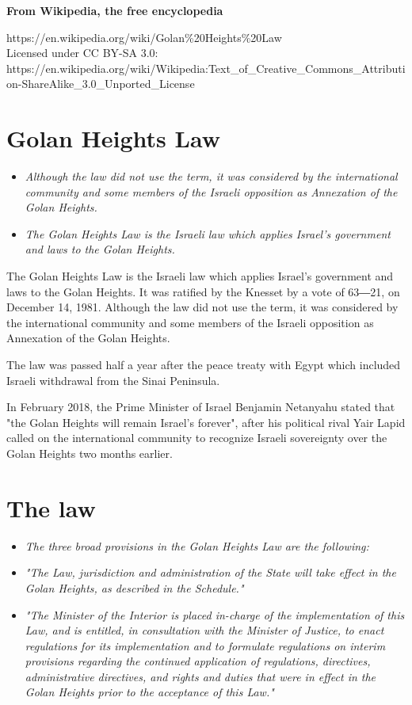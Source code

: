 \textbf{From Wikipedia, the free encyclopedia}

https://en.wikipedia.org/wiki/Golan\%20Heights\%20Law\\
Licensed under CC BY-SA 3.0:\\
https://en.wikipedia.org/wiki/Wikipedia:Text\_of\_Creative\_Commons\_Attribution-ShareAlike\_3.0\_Unported\_License

\section{Golan Heights Law}\label{golan-heights-law}

\begin{itemize}
\item
  \emph{Although the law did not use the term, it was considered by the
  international community and some members of the Israeli opposition as
  Annexation of the Golan Heights.}
\item
  \emph{The Golan Heights Law is the Israeli law which applies Israel's
  government and laws to the Golan Heights.}
\end{itemize}

The Golan Heights Law is the Israeli law which applies Israel's
government and laws to the Golan Heights. It was ratified by the Knesset
by a vote of 63―21, on December 14, 1981. Although the law did not use
the term, it was considered by the international community and some
members of the Israeli opposition as Annexation of the Golan Heights.

The law was passed half a year after the peace treaty with Egypt which
included Israeli withdrawal from the Sinai Peninsula.

In February 2018, the Prime Minister of Israel Benjamin Netanyahu stated
that "the Golan Heights will remain Israel's forever", after his
political rival Yair Lapid called on the international community to
recognize Israeli sovereignty over the Golan Heights two months earlier.

\section{The law}\label{the-law}

\begin{itemize}
\item
  \emph{The three broad provisions in the Golan Heights Law are the
  following:}
\item
  \emph{"The Law, jurisdiction and administration of the State will take
  effect in the Golan Heights, as described in the Schedule."}
\item
  \emph{"The Minister of the Interior is placed in-charge of the
  implementation of this Law, and is entitled, in consultation with the
  Minister of Justice, to enact regulations for its implementation and
  to formulate regulations on interim provisions regarding the continued
  application of regulations, directives, administrative directives, and
  rights and duties that were in effect in the Golan Heights prior to
  the acceptance of this Law."}
\end{itemize}

